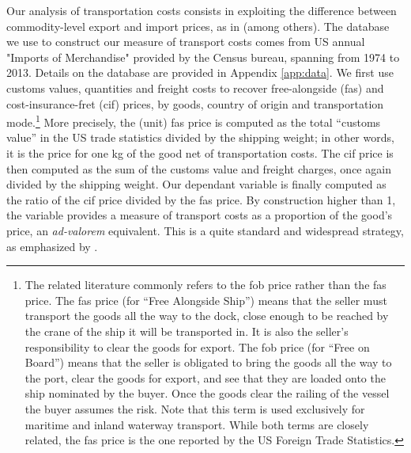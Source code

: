 \documentclass[a4paper,11pt]{article}
\begin{document}
Our analysis of transportation costs consists in exploiting the difference between commodity-level export and import prices, as in \cite{hummels2007} (among others). The database we use to construct our measure of transport costs comes from US annual "Imports of Merchandise" provided by the Census bureau, spanning from 1974 to 2013. Details on the database are provided in Appendix \ref{app:data}. We first use customs values, quantities and freight costs to recover free-alongside (fas) and cost-insurance-fret (cif) prices, by goods, country of origin and transportation mode.\footnote{The related literature commonly refers to the fob price rather than the fas price. The fas price (for ``Free Alongside Ship'') means that the seller must transport the goods all the way to the dock, close enough to be reached by the crane of the ship it will be transported in. It is also the seller's responsibility to clear the goods for export. The fob price (for ``Free on Board'') means that the seller is obligated to bring the goods all the way to the port, clear the goods for export, and see that they are loaded onto the ship nominated by the buyer. Once the goods clear the railing of the vessel the buyer assumes the risk. Note that this term is used exclusively for maritime and inland waterway transport. While both terms are closely related, the fas price is the one reported by the US Foreign Trade Statistics.} More precisely, the (unit) fas price is computed as the total ``customs value'' in the US trade statistics divided by the shipping weight; in other words, it is the price for one kg of the good net of transportation costs. The cif price is then computed as the sum of the customs value and freight charges, once again divided by the shipping weight. Our dependant variable is finally computed as the ratio of the cif price divided by the fas price. By construction higher than 1, the variable provides a measure of transport costs as a proportion of the good's price, an \emph{ad-valorem} equivalent. This is a quite standard and widespread strategy, as emphasized by \citet{anderson_wincoop_jel}.
\end{document}
